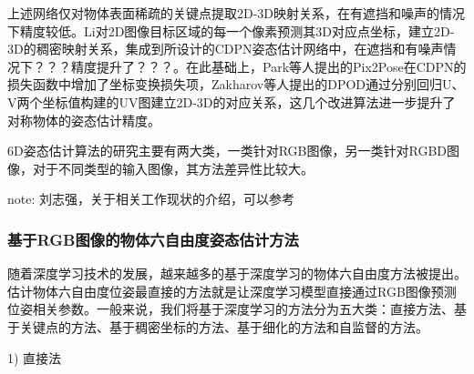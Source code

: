 \documentclass[12pt]{article}
\newcommand{\note}[1]{\textcolor[rgb]{0.6,0,0}{note: #1}}
\begin{document}
上述网络仅对物体表面稀疏的关键点提取2D-3D映射关系，在有遮挡和噪声的情况下精度较低。Li对2D图像目标区域的每一个像素预测其3D对应点坐标，建立2D-3D的稠密映射关系，集成到所设计的CDPN\cite{li2019cdpn}姿态估计网络中，在遮挡和有噪声情况下？？？精度提升了？？？。在此基础上，Park等人提出的Pix2Pose\cite{park2019pix2pose}在CDPN的损失函数中增加了坐标变换损失项，Zakharov等人提出的DPOD\cite{zakharov2019dpod}通过分别回归U、V两个坐标值构建的UV图建立2D-3D的对应关系，这几个改进算法进一步提升了对称物体的姿态估计精度。



6D姿态估计算法的研究主要有两大类，一类针对RGB图像\cite{Marullo2022}，另一类针对RGBD图像\cite{Sahin2019}，对于不同类型的输入图像，其方法差异性比较大\cite{ZhangShaoBoPhd}。

\note{刘志强，关于相关工作现状的介绍，可以参考\cite{ZhangShaoBoPhd}}



\subsubsection{基于RGB图像的物体六自由度姿态估计方法}

随着深度学习技术的发展，越来越多的基于深度学习的物体六自由度方法被提出。估计物体六自由度位姿最直接的方法就是让深度学习模型直接通过RGB图像预测位姿相关参数。一般来说，我们将基于深度学习的方法分为五大类：直接方法、基于关键点的方法、基于稠密坐标的方法、基于细化的方法和自监督的方法。

1) 直接法
\end{document}
